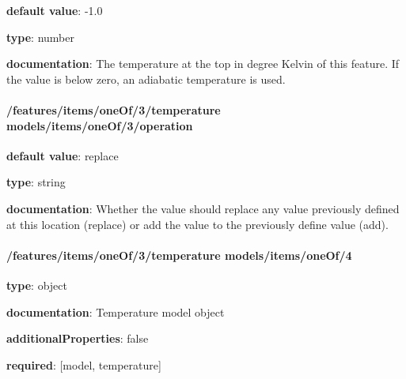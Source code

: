 \begin{itemized}
\item {\bf default value}: -1.0
\item {\bf type}: number
\item {\bf documentation}: The temperature at the top in degree Kelvin of this feature. If the value is below zero, an adiabatic temperature is used.
\end{itemized}\paragraph{/features/items/oneOf/3/temperature models/items/oneOf/3/operation} \begin{itemized}
\item {\bf default value}: replace
\item {\bf type}: string
\item {\bf documentation}: Whether the value should replace any value previously defined at this location (replace) or add the value to the previously define value (add).
\end{itemized}\paragraph{/features/items/oneOf/3/temperature models/items/oneOf/4} \begin{itemized}
\item {\bf type}: object
\item {\bf documentation}: Temperature model object
\item {\bf additionalProperties}: false
\item {\bf required}: [model, temperature]\end{itemized}
